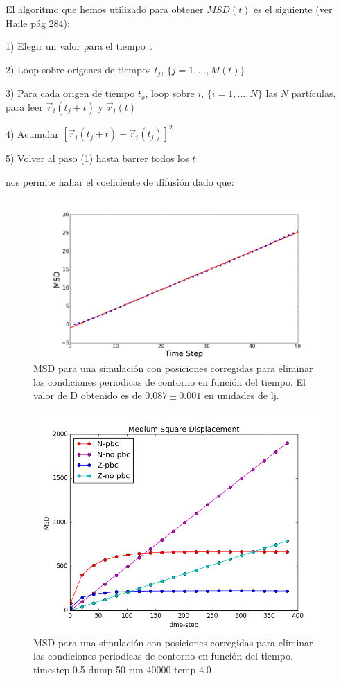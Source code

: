 \documentclass[
 reprint,
 amsmath,amssymb,
 aps,
 a4paper
]{revtex4-1}
\begin{document}
El algoritmo que hemos utilizado para obtener $MSD(t)$ es el siguiente (ver Haile pág 284):

1) Elegir un valor para el tiempo t

2) Loop sobre orígenes de tiempos $t_j$, $\{j=1,...,M(t)\}$

3) Para cada origen de tiempo $t_o$, loop sobre $i$, $\{i=1,...,N\}$ las $N$ partículas, para leer $\vec{r}_i(t_j+t)$ y $\vec{r}_i(t)$

4) Acumular $[\vec{r}_i(t_{j}+t)-\vec{r}_i(t_{j})]^2$

5) Volver al paso (1) hasta barrer todos los $t$

 nos permite hallar el coeficiente de difusión dado que:

 

\begin{figure}[H]
\centerline{
  \includegraphics[width=1.0\linewidth]{msdvst.png}}
  \caption{\small MSD para una simulación con posiciones corregidas para eliminar las condiciones periodicas de contorno en función del tiempo. El valor de D obtenido es de $0.087 \pm 0.001$ en unidades de lj.}
  \label{fig:forcs}
\end{figure}

\begin{figure}[H]
\centerline{
  \includegraphics[width=1.0\linewidth]{msd_t400.png}}
  \caption{\small MSD para una simulación con posiciones corregidas para eliminar las condiciones periodicas de contorno en función del tiempo. timestep 0.5 dump 50 run 40000 temp 4.0}
  \label{fig:msd_t400} 
\end{figure}
\end{document}
